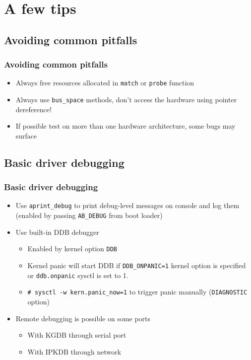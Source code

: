 \documentclass[dvipsnames,table]{beamer}
\begin{document}
\section{A few tips}

\subsection{Avoiding common pitfalls}

\begin{frame}
\frametitle{Avoiding common pitfalls}

\begin{itemize}
	\item Always free resources allocated in {\tt match} or {\tt probe} function
	\item Always use {\tt bus\_space} methods, don't access the hardware using pointer dereference!
	\item If possible test on more than one hardware architecture, some bugs may surface
\end{itemize}
\end{frame}

\subsection{Basic driver debugging}

\begin{frame}
\frametitle{Basic driver debugging} 
\begin{itemize}
	\item Use {\tt aprint\_debug} to print debug-level messages on console and log them (enabled by passing {\tt AB\_DEBUG} from boot loader)
	\item Use built-in DDB debugger
	\begin{itemize}
			\item Enabled by kernel option {\tt DDB}
			\item Kernel panic will start DDB if {\tt DDB\_ONPANIC=1} kernel option is specified or {\tt ddb.onpanic} sysctl is set to 1.
			\item {\tt \# sysctl -w kern.panic\_now=1} to trigger panic manually ({\tt DIAGNOSTIC} option)
	\end{itemize}	
	\item Remote debugging is possible on some ports
	\begin{itemize}
			\item With KGDB through serial port
			\item With IPKDB through network
	\end{itemize}	
\end{itemize}
\end{frame}
\end{document}
